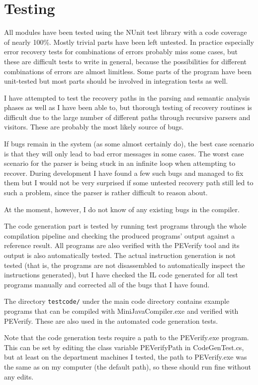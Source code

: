 \documentclass[a4paper,11pt]{article}
\begin{document}
\section{Testing}

All modules have been tested using the NUnit test library with a code coverage of nearly 100\%. Mostly trivial parts have been left untested. In practice especially error recovery tests for combinations of errors probably miss some cases, but these are difficult tests to write in general, because the possibilities for different combinations of errors are almost limitless. Some parts of the program have been unit-tested but most parts should be involved in integration tests as well.

I have attempted to test the recovery paths in the parsing and semantic analysis phases as well as I have been able to, but thorough testing of recovery routines is difficult due to the large number of different paths through recursive parsers and visitors. These are probably the most likely source of bugs.

If bugs remain in the system (as some almost certainly do), the best case scenario is that they will only lead to bad error messages in some cases. The worst case scenario for the parser is being stuck in an infinite loop when attempting to recover. During development I have found a few such bugs and managed to fix them but I would not be very surprised if some untested recovery path still led to such a problem, since the parser is rather difficult to reason about.

At the moment, however, I do not know of any existing bugs in the compiler.

The code generation part is tested by running test programs through the whole compilation pipeline and checking the produced programs' output against a reference result. All programs are also verified with the PEVerify tool and its output is also automatically tested. The actual instruction generation is not tested (that is, the programs are not disassembled to automatically inspect the instructions generated), but I have checked the IL code generated for all test programs manually and corrected all of the bugs that I have found.

The directory \verb,testcode/, under the main code directory contains example programs that can be compiled with MiniJavaCompiler.exe and verified with PEVerify. These are also used in the automated code generation tests.

Note that the code generation tests require a path to the PEVerify.exe program. This can be set by editing the class variable PEVerifyPath in CodeGenTest.cs, but at least on the department machines I tested, the path to PEVerify.exe was the same as on my computer (the default path), so these should run fine without any edits.
\end{document}
